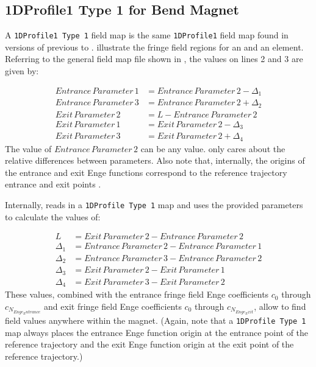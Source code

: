 \clearpage

\subsection{1DProfile1 Type 1 for Bend Magnet}
\label{ssec:1DProfile1Type1}
A \texttt{1DProfile1 Type 1} field map is the same \texttt{1DProfile1} field map found in versions of \opal previous to
\opal {} .  illustrate the fringe field
regions for an  and an  element. Referring to the general field map file shown in
, the values on lines 2 and 3 are given by:

\begin{align*}
  Entrance\,Parameter\,1 &= Entrance\,Parameter\,2 - \Delta_{1} \\
  Entrance\,Parameter\,3 &= Entrance\,Parameter\,2 + \Delta_{2} \\
  Exit\,Parameter\,2 &= L - Entrance\,Parameter\,2 \\
  Exit\,Parameter\,1 &= Exit\,Parameter\,2 - \Delta_{3} \\
  Exit\,Parameter\,3 &= Exit\,Parameter\,2 + \Delta_{4}
\end{align*}
The value of $Entrance\,Parameter\,2$ can be any value. \opal only cares about the relative differences between
parameters. Also note that, internally, the origins of the entrance and exit Enge functions correspond to the
reference trajectory entrance and exit points .

Internally, \opal reads in a \texttt{1DProfile Type 1} map and uses the provided parameters to calculate the values of:

\begin{align*}
L &= Exit\,Parameter\,2 - Entrance\,Parameter\,2 \\
\Delta_{1} &= Entrance\,Parameter\,2 - Entrance\,Parameter\,1 \\
\Delta_{2} &= Entrance\,Parameter\,3 - Entrance\,Parameter\,2 \\
\Delta_{3} &= Exit\,Parameter\,2 - Exit\,Parameter\,1 \\
\Delta_{4} &= Exit\,Parameter\,3 - Exit\,Parameter\,2
\end{align*}
These values, combined with the entrance fringe field Enge coefficients $c_0$ through $c_{N_{Enge_Entrance}}$ and exit fringe field Enge coefficients $c_0$ through $c_{N_{Enge_Exit}}$, allow \opal to find field values anywhere within the magnet. (Again, note that a \texttt{1DProfile Type 1} map always places the entrance Enge function origin at the entrance point of the reference trajectory and the exit Enge function origin at the exit point of the reference trajectory.)

